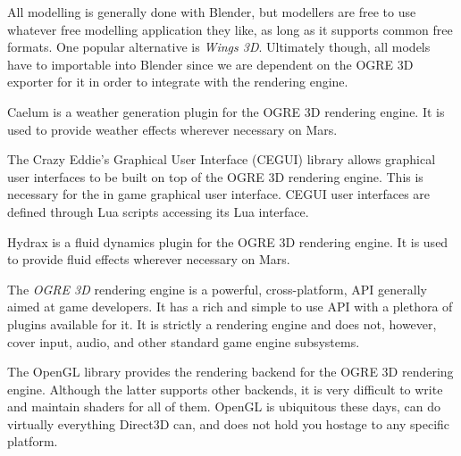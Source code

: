 

\startitemize[4]

All modelling is generally done with Blender, but modellers are free to use whatever free modelling application they like, as long as it supports common free formats. One popular alternative is {\it Wings 3D}. Ultimately though, all models have to importable into Blender since we are dependent on the OGRE 3D exporter for it in order to integrate with the rendering engine.


Caelum is a weather generation plugin for the OGRE 3D rendering engine. It is used to provide weather effects wherever necessary on Mars.


The Crazy Eddie's Graphical User Interface (CEGUI) library allows graphical user interfaces to be built on top of the OGRE 3D rendering engine. This is necessary for the in game graphical user interface. CEGUI user interfaces are defined through Lua scripts accessing its Lua interface.


Hydrax is a fluid dynamics plugin for the OGRE 3D rendering engine. It is used to provide fluid effects wherever necessary on Mars.


The {\it OGRE 3D} rendering engine is a powerful, cross-platform, API generally aimed at game developers. It has a rich and simple to use API with a plethora of plugins available for it. It is strictly a rendering engine and does not, however, cover input, audio, and other standard game engine subsystems.


The OpenGL library provides the rendering backend for the OGRE 3D rendering engine. Although the latter supports other backends, it is very difficult to write and maintain shaders for all of them. OpenGL is ubiquitous these days, can do virtually everything Direct3D can, and does not hold you hostage to any specific platform.


